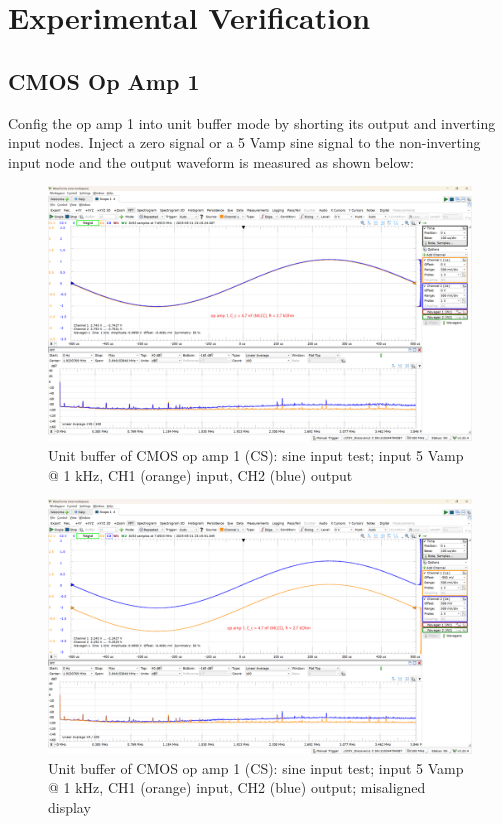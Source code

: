 \documentclass[UTF8]{article}
\begin{document}
\section{Experimental Verification}

\subsection{CMOS Op Amp 1}

Config the op amp 1 into unit buffer mode by shorting its output and inverting input nodes. Inject a zero signal or a 5 Vamp sine signal to the non-inverting input node and the output waveform is measured as shown below:

\begin{figure}[H]\centering
    \includegraphics[width=\columnwidth]{LCE-06-07-运放设计/assets/op amp 1/unit 1.png}
    \caption{Unit buffer of CMOS op amp 1 (CS): sine input test; input 5 Vamp @ 1 kHz, CH1 (orange) input, CH2 (blue) output}
\end{figure}

\begin{figure}[H]\centering
    \includegraphics[width=\columnwidth]{LCE-06-07-运放设计/assets/op amp 1/unit 2.png}
    \caption{Unit buffer of CMOS op amp 1 (CS): sine input test; input 5 Vamp @ 1 kHz, CH1 (orange) input, CH2 (blue) output; misaligned display}
\end{figure}
\end{document}
